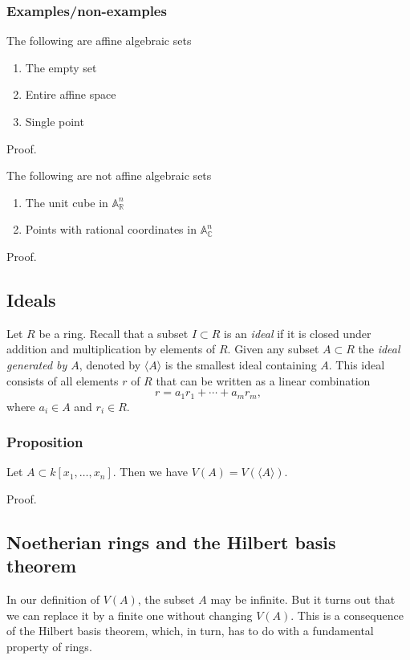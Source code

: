 \documentclass[11pt]{article}
\begin{document}
\subsubsection{Examples/non-examples}
\label{sec:org3356168}
The following are affine algebraic sets
\begin{enumerate}
\item The empty set
\item Entire affine space
\item Single point
\end{enumerate}
\begin{skipped}
Proof.
\end{skipped}

The following are not affine algebraic sets
\begin{enumerate}
\item The unit cube in \(\mathbb A^n_{{\mathbb R}}\)
\item Points with rational coordinates in \(\mathbb A^n_{{\mathbb C}}\)
\end{enumerate}
\begin{skipped}
Proof.
\end{skipped}

\subsection{Ideals}
\label{sec:orgf057b15}
Let \(R\) be a ring.
Recall that a subset \(I \subset R\) is an \emph{ideal} if it is closed under addition and multiplication by elements of \(R\).
Given any subset \(A \subset R\) the \emph{ideal generated by \(A\)}, denoted by \(\langle A \rangle\) is the smallest ideal containing \(A\).
This ideal consists of all elements \(r\) of  \(R\) that can be written as a linear combination
\[ r = a_1 r_1 + \cdots + a_m r_m,\]
where \(a_i \in A\) and \(r_i \in R\).

\subsubsection{Proposition}
\label{sec:org98afbe8}
Let \(A \subset k[x_1,\dots,x_n]\). Then we have \(V(A) = V(\langle A \rangle)\).
\begin{skipped}
Proof.
\end{skipped}

\subsection{Noetherian rings and the Hilbert basis theorem}
\label{sec:org2c0d170}
In our definition of \(V(A)\), the subset \(A\) may be infinite. 
But it turns out that we can replace it by a finite one without changing \(V(A)\).
This is a consequence of the Hilbert basis theorem, which, in turn, has to do with a fundamental property of rings.
\end{document}

